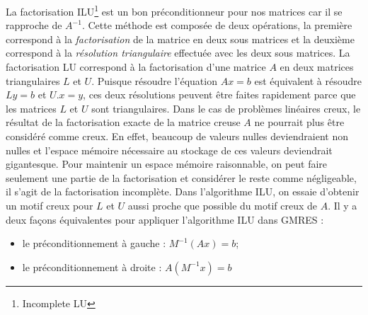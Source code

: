 La factorisation ILU\footnote{Incomplete LU} est un bon préconditionneur pour nos matrices car il se rapproche de $A^{-1}$.
%
Cette méthode est composée de deux opérations, la première correspond à la {\em factorisation} de la matrice en deux sous matrices et la deuxième correspond à la {\em résolution triangulaire} effectuée avec les deux sous matrices.
%
La factorisation LU correspond à la factorisation d'une matrice $A$ en deux matrices triangulaires $L$ et $U$.
%
Puisque résoudre l'équation $Ax=b$ est équivalent à résoudre $Ly=b$ et $U.x=y$, ces deux résolutions peuvent être faites rapidement parce que les matrices $L$ et $U$ sont triangulaires.
%
Dans le cas de problèmes linéaires creux, le résultat de la factorisation exacte de la matrice creuse $A$ ne pourrait plus être considéré comme creux.
%
En effet, beaucoup de valeurs nulles deviendraient non nulles et l'espace mémoire nécessaire au stockage de ces valeurs deviendrait gigantesque.
%
Pour maintenir un espace mémoire raisonnable, on peut faire seulement une partie de la factorisation et considérer le reste comme négligeable, il s'agit de la factorisation incomplète.
%
Dans l'algorithme ILU, on essaie d'obtenir un motif creux pour $L$ et $U$ aussi proche que possible du motif creux de $A$.
%
Il y a deux façons équivalentes pour appliquer l'algorithme ILU dans GMRES :
\begin{itemize}
  \item le préconditionnement à gauche : $M^{-1}(Ax)=b$;
  \item le préconditionnement à droite : $A(M^{-1}x)=b$
\end{itemize}
%
